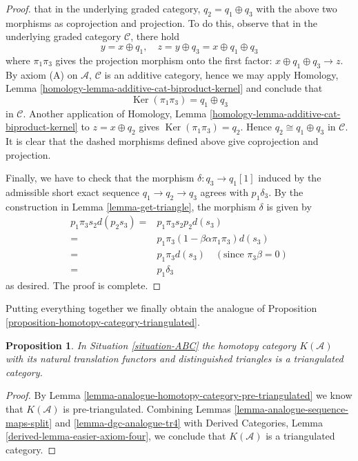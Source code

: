 \documentclass{stacks-project}
\theoremstyle{plain}
\newtheorem{proposition}[subsection]{Proposition}
\theoremstyle{definition}
\theoremstyle{remark}
\numberwithin{equation}{subsection}
\def\Ker{\mathop{\mathrm{Ker}}}
\begin{document}
\begin{proof}
that in the underlying graded category, $q_2 = q_1\oplus q_3$
with the above two morphisms as coprojection and projection.
To do this, observe that in the underlying graded category
$\mathcal{C}$, there hold
$$
y = x\oplus q_1,\quad
z = y\oplus q_3 = x\oplus q_1\oplus q_3
$$
where $\pi_1\pi_3$ gives the projection morphism onto the first
factor: $x\oplus q_1\oplus q_3\to z$. By axiom (A) on
$\mathcal{A}$, $\mathcal{C}$ is an additive category, hence
we may apply
Homology, Lemma \ref{homology-lemma-additive-cat-biproduct-kernel}
and conclude that
$$
\Ker(\pi_1\pi_3) = q_1\oplus q_3
$$
in $\mathcal{C}$. Another application of
Homology, Lemma \ref{homology-lemma-additive-cat-biproduct-kernel}
to $z = x\oplus q_2$ gives $\Ker(\pi_1\pi_3) = q_2$.
Hence $q_2\cong q_1\oplus q_3$ in $\mathcal{C}$.
It is clear that the dashed morphisms defined above give
coprojection and projection.

\medskip\noindent
Finally, we have to check that the morphism
$\delta : q_3 \to q_1[1]$ induced by the admissible
short exact sequence $q_1\to q_2\to q_3$ agrees with
$p_1\delta_3$. By the construction in
Lemma \ref{lemma-get-triangle}, the morphism $\delta$ is given by
\begin{align*}
p_1\pi_3s_2d(p_2s_3)
= &
p_1\pi_3s_2p_2d(s_3) \\
= &
p_1\pi_3(1-\beta\alpha\pi_1\pi_3)d(s_3) \\
= &
p_1\pi_3d(s_3)\quad (\text{since }\pi_3\beta = 0) \\
= &
p_1\delta_3
\end{align*}
as desired. The proof is complete.
\end{proof}

\noindent
Putting everything together we finally obtain the analogue
of Proposition \ref{proposition-homotopy-category-triangulated}.

\begin{proposition}
\label{proposition-ABC-homotopy-category-triangulated}
In Situation \ref{situation-ABC} the homotopy category $K(\mathcal{A})$
with its natural translation functors and distinguished triangles is a
triangulated category.
\end{proposition}

\begin{proof}
By Lemma \ref{lemma-analogue-homotopy-category-pre-triangulated} we know that
$K(\mathcal{A})$ is pre-triangulated. Combining
Lemmas \ref{lemma-analogue-sequence-maps-split} and
\ref{lemma-dgc-analogue-tr4} with
Derived Categories, Lemma \ref{derived-lemma-easier-axiom-four},
we conclude that $K(\mathcal{A})$ is a triangulated category.
\end{proof}
\end{document}
